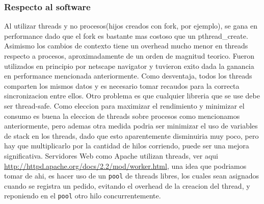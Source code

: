 \subsubsection{Respecto al software}
Al utilizar threads y no procesos(hijos creados con fork, por ejemplo), se gana en performance dado que el fork es bastante mas costoso que un pthread\_create. Asimismo los cambios de contexto tiene un overhead mucho menor en threads respecto a procesos, aproximadamente de un orden de magnitud teorico. Fueron utilizados en principio por netscape navigator y tuvieron exito dada la ganancia en performance mencionada anteriormente. Como desventaja, todos los threads comparten los mismos datos y es necesario tomar recaudos para la correcta sincronizacion entre ellos. Otro problema es que cualquier libreria que se use debe ser thread-safe.
Como eleccion para maximizar el rendimiento y minimizar el consumo es buena la eleccion de threads sobre procesos como mencionamos anteriormente, pero ademas otra medida podria ser minimizar el uso de variables de stack en los threads, dado que esto aparentemente disminuiria muy poco, pero hay que multiplicarlo por la cantidad de hilos corriendo, puede ser una mejora significativa. Servidores Web como Apache utilizan threads, ver aqui \url{http://httpd.apache.org/docs/2.2/mod/worker.html}, una idea que podriamos tomar de ahi, es hacer uso de un \verb|pool| de threads libres, los cuales sean asignados cuando se registra un pedido, evitando el overhead de la creacion del thread, y reponiendo en el \verb|pool| otro hilo concurrentemente. 